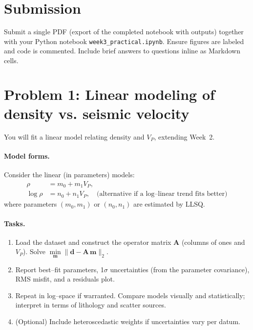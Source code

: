 \documentclass[11pt,a4paper]{article}
\begin{document}
\section*{Submission}
Submit a single PDF (export of the completed notebook with outputs) together with your Python notebook \texttt{week3\_practical.ipynb}. Ensure figures are labeled and code is commented. Include brief answers to questions inline as Markdown cells.

\section{Problem 1: Linear modeling of density vs. seismic velocity}
You will fit a linear model relating density and $V_P$, extending Week~2.

\paragraph{Model forms.} Consider the linear (in parameters) models:
\begin{align}
  \rho &= m_0 + m_1 V_P, \\
  \log \rho &= n_0 + n_1 V_P, \quad\text{(alternative if a log--linear trend fits better)}
\end{align}
where parameters $(m_0,m_1)$ or $(n_0,n_1)$ are estimated by LLSQ.

\paragraph{Tasks.}
\begin{enumerate}
  \item Load the dataset and construct the operator matrix $\mathbf A$ (columns of ones and $V_P$). Solve $\min\limits_{\mathbf m} \lVert \mathbf d - \mathbf A\,\mathbf m \rVert_2$.
  \item Report best--fit parameters, 1$\sigma$ uncertainties (from the parameter covariance), RMS misfit, and a residuals plot.
  \item Repeat in log--space if warranted. Compare models visually and statistically; interpret in terms of lithology and scatter sources.
  \item (Optional) Include heteroscedastic weights if uncertainties vary per datum.
\end{enumerate}
\end{document}
